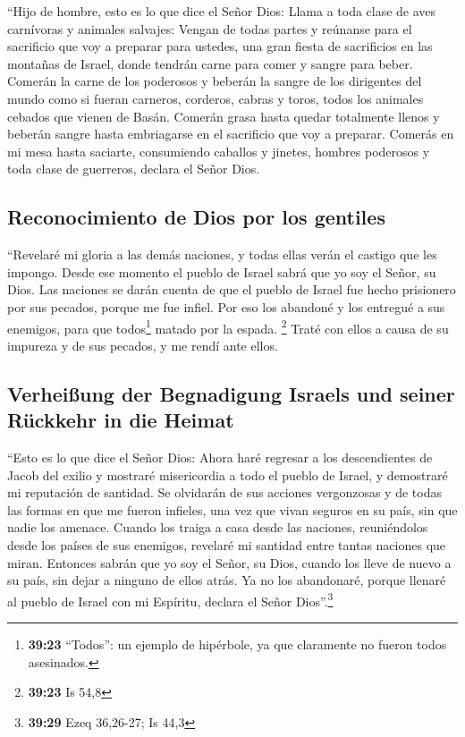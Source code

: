  ``Hijo de hombre, esto es lo que dice el Señor Dios:
Llama a toda clase de aves carnívoras y animales salvajes: Vengan de
todas partes y reúnanse para el sacrificio que voy a preparar para
ustedes, una gran fiesta de sacrificios en las montañas de Israel, donde
tendrán carne para comer y sangre para beber.  Comerán la
carne de los poderosos y beberán la sangre de los dirigentes del mundo
como si fueran carneros, corderos, cabras y toros, todos los animales
cebados que vienen de Basán.  Comerán grasa hasta quedar
totalmente llenos y beberán sangre hasta embriagarse en el sacrificio
que voy a preparar.  Comerás en mi mesa hasta saciarte,
consumiendo caballos y jinetes, hombres poderosos y toda clase de
guerreros, declara el Señor Dios.

\hypertarget{reconocimiento-de-dios-por-los-gentiles}{%
\subsection{Reconocimiento de Dios por los
gentiles}\label{reconocimiento-de-dios-por-los-gentiles}}

 ``Revelaré mi gloria a las demás naciones, y todas ellas
verán el castigo que les impongo.  Desde ese momento el
pueblo de Israel sabrá que yo soy el Señor, su Dios.  Las
naciones se darán cuenta de que el pueblo de Israel fue hecho prisionero
por sus pecados, porque me fue infiel. Por eso los abandoné y los
entregué a sus enemigos, para que todos\footnote{\textbf{39:23}
  ``Todos'': un ejemplo de hipérbole, ya que claramente no fueron todos
  asesinados.} matado por la espada. \footnote{\textbf{39:23} Is 54,8}
 Traté con ellos a causa de su impureza y de sus pecados,
y me rendí ante ellos.

\hypertarget{verheiuxdfung-der-begnadigung-israels-und-seiner-ruxfcckkehr-in-die-heimat}{%
\subsection{Verheißung der Begnadigung Israels und seiner Rückkehr in
die
Heimat}\label{verheiuxdfung-der-begnadigung-israels-und-seiner-ruxfcckkehr-in-die-heimat}}

 ``Esto es lo que dice el Señor Dios: Ahora haré regresar
a los descendientes de Jacob del exilio y mostraré misericordia a todo
el pueblo de Israel, y demostraré mi reputación de santidad.
 Se olvidarán de sus acciones vergonzosas y de todas las
formas en que me fueron infieles, una vez que vivan seguros en su país,
sin que nadie los amenace.  Cuando los traiga a casa
desde las naciones, reuniéndolos desde los países de sus enemigos,
revelaré mi santidad entre tantas naciones que miran. 
Entonces sabrán que yo soy el Señor, su Dios, cuando los lleve de nuevo
a su país, sin dejar a ninguno de ellos atrás.  Ya no los
abandonaré, porque llenaré al pueblo de Israel con mi Espíritu, declara
el Señor Dios''.\footnote{\textbf{39:29} Ezeq 36,26-27; Is 44,3}


